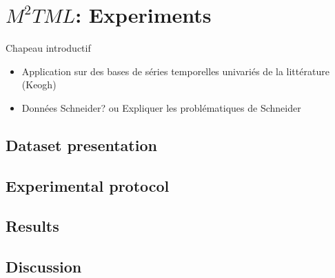 \chapter{$M^2TML$: Experiments}
\label{sec:unchapitre}
\minitoc


\noindent Chapeau introductif
\begin{itemize}
	\item Application sur des bases de séries temporelles univariés de la littérature (Keogh)
	\item Données Schneider? ou Expliquer les problématiques de Schneider
\end{itemize}

\section{Dataset presentation}

\section{Experimental protocol}


\section{Results}


\section{Discussion}


